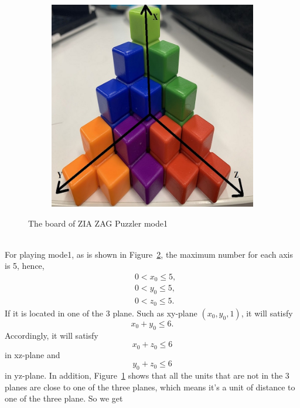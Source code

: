 \begin{figure}[htbp]
\begin{subfigure}[b]{.4\textwidth}
\includegraphics[width=\textwidth]{figs/3Dboard1.jpg}
\caption{}
\label{figure:mode1B}
\end{subfigure}
\caption{The board of ZIA ZAG Puzzler mode1}
  \label{fig:board1}
\end{figure}
\\For playing mode1, as is shown in Figure~\ref{fig:board1}, the maximum number for each axis is 5, hence,
\begin{equation}
\begin{aligned}
&0<x_{0}\leq5,\\
&0<y_{0}\leq5,\\
&0<z_{0}\leq5.
\end{aligned}
\end{equation}
If it is located in one of the 3 plane. Such as xy-plane $(x_{0},y_{0},1)$, it will satisfy
\begin{equation}
x_{0}+y_{0}\leq6.
\end{equation}
Accordingly, it will satisfy 
\begin{equation}
x_{0}+z_{0}\leq6
\end{equation}
in xz-plane and 
\begin{equation}
y_{0}+z_{0}\leq6
\end{equation}
in yz-plane. In addition, Figure~\ref{figure:mode1B} shows that all the units that are not in the 3 planes are close to one of the three planes, which means it's a unit of distance to one of the three plane. So we get
